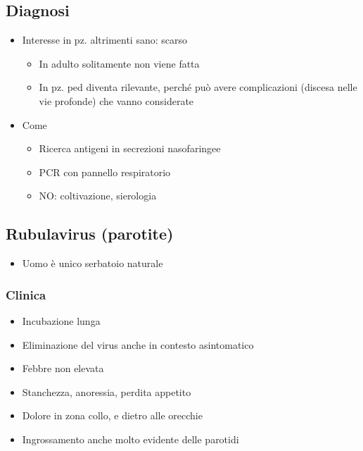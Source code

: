 \documentclass[italian,]{article}
\providecommand{\tightlist}{%
  \setlength{\itemsep}{0pt}\setlength{\parskip}{0pt}}
\newcommand{\asidefigure}[2]{\marginpar{\phantom{Img:}\newline\texttt{[image: \#1]}\\\footnotesize\emph{#2}}}
\begin{document}
\hypertarget{diagnosi-10}{%
\subsection{Diagnosi}\label{diagnosi-10}}

\begin{itemize}
\tightlist
\item
  Interesse in pz. altrimenti sano: scarso

  \begin{itemize}
  \tightlist
  \item
    In adulto solitamente non viene fatta
  \item
    In pz. ped diventa rilevante, perché può avere complicazioni
    (discesa nelle vie profonde) che vanno considerate
  \end{itemize}
\item
  Come

  \begin{itemize}
  \tightlist
  \item
    Ricerca antigeni in secrezioni nasofaringee
  \item
    PCR con pannello respiratorio
  \item
    NO: coltivazione, sierologia
  \end{itemize}
\end{itemize}

\hypertarget{rubulavirus-parotite}{%
\subsection{Rubulavirus (parotite)}\label{rubulavirus-parotite}}

\begin{itemize}
\tightlist
\item
  Uomo è unico serbatoio naturale
\end{itemize}

\hypertarget{clinica}{%
\subsubsection{Clinica}\label{clinica}}

\begin{itemize}
\tightlist
\item
  Incubazione lunga
\item
  Eliminazione del virus anche in contesto asintomatico
\item
  Febbre non elevata
\item
  Stanchezza, anoressia, perdita appetito
\item
  Dolore in zona collo, e dietro alle orecchie
  \asidefigure{img/parotite.png}{}
\item
  Ingrossamento anche molto evidente delle parotidi
\end{itemize}
\end{document}

